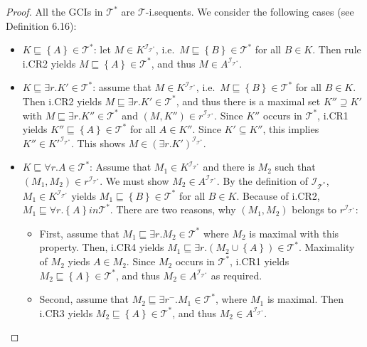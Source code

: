 \begin{proof}
	All the GCIs in $\mathcal{T}^*$ are $\mathcal{T}$-i.sequents.
	We consider the following cases (see Definition 6.16):
	\begin{itemize}
		\item $K \sqsubseteq \left\{ A \right\} \in \mathcal{T}^*$:
			let $M \in K^{\mathcal{I}_{\mathcal{T}^*}}$, i.e.\ $M \sqsubseteq \left\{ B \right\} \in \mathcal{T}^*$ for all $B \in K$.
			Then rule i.CR2 yields $M \sqsubseteq \left\{ A \right\} \in \mathcal{T}^*$,
			and thus $M \in A^{\mathcal{I}_{\mathcal{T}^*}}$.
		\item $K \sqsubseteq \exists r.K' \in \mathcal{T}^*$:
			assume that $M \in K^{\mathcal{I}_{\mathcal{T}^*}}$, i.e.\ $M \sqsubseteq \left\{ B \right\} \in \mathcal{T}^*$ for all $B \in K$.
			Then i.CR2 yields $M \sqsubseteq \exists r.K' \in \mathcal{T}^*$,
			and thus there is a maximal set $K'' \supseteq K'$ with $M \sqsubseteq \exists r.K'' \in \mathcal{T}^*$
			and $(M, K'') \in r^{\mathcal{I}_{\mathcal{T}^*}}$.
			Since $K''$ occurs in $\mathcal{T}^*$,
			i.CR1 yields $K '' \sqsubseteq \left\{ A \right\} \in \mathcal{T}^*$ for all $A \in K''$.
			Since $K' \subseteq K''$, this implies $K'' \in K'^{\mathcal{I}_{\mathcal{T}^*}}$.
			This shows $M \in \left( \exists r.K' \right)^{\mathcal{I}_{\mathcal{T}^*}}$.
		\item $K \sqsubseteq \forall r.A \in \mathcal{T}^*$:
			Assume that $M_1 \in K^{\mathcal{I}_{\mathcal{T}^*}}$ and there is $M_2$ such that
			$\left( M_1, M_2  \right) \in r^{\mathcal{I}_{\mathcal{T}^*}}$.
			We must show $M_2 \in A^{\mathcal{I}_{\mathcal{T}^*}}$.
			By the definition of $\mathcal{I}_{\mathcal{T}^*}$,
			$M_1 \in K^{\mathcal{I}_{\mathcal{T}^*}}$ yields
			$M_1 \sqsubseteq \left\{ B \right\} \in \mathcal{T}^*$ for all $B \in K$.
			Because of i.CR2, $M_1 \sqsubseteq \forall r.\left\{ A \right\} in \mathcal{T}^*$.
			There are two reasons, why $\left( M_1, M_2 \right)$ belongs to $r^{\mathcal{I}_{\mathcal{T}^*}}$:
			\begin{itemize}
				\item First, assume that $M_1 \sqsubseteq \exists r. M_2 \in \mathcal{T}^*$
					where $M_2$ is maximal with this property.
					Then, i.CR4 yields $M_1 \sqsubseteq \exists r.\left( M_2 \cup \left\{ A \right\} \right) \in \mathcal{T}^*$.
					Maximality of $M_2$ yieds $A \in M_2$.
					Since $M_2$ occurs in $\mathcal{T}^*$, i.CR1 yields $M_2 \sqsubseteq \left\{ A \right\} \in \mathcal{T}^*$,
					and thus $M_2 \in A^{\mathcal{I}_{\mathcal{T}^*}}$ as required.
				\item Second, assume that $M_2 \sqsubseteq \exists r^-.M_1 \in \mathcal{T}^*$, where $M_1$ is maximal.
					Then i.CR3 yields $M_2 \sqsubseteq \left\{ A \right\} \in \mathcal{T}^*$,
					and thus $M_2 \in A^{\mathcal{I}_{\mathcal{T}^*}}$.
					\qedhere
			\end{itemize}
	\end{itemize}
\end{proof}
